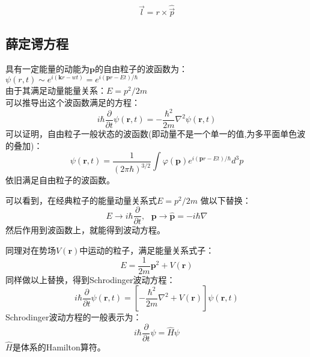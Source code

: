 \begin{equation}
    \vec{{l}}=r \times \hat{\vec{p}}
\end{equation}

\subsection{薛定谔方程}
具有一定能量的动能为$\boldsymbol{p}$的自由粒子的波函数为：  $\psi(r,t)\sim e^{i(\boldsymbol{k}r-wt)}=e^{i(\boldsymbol{p}r-Et)/\hbar}$\\
由于其满足动量能量关系：$E=p^2/2m$\\
可以推导出这个波函数满足的方程：
\begin{equation}
    i\hbar \frac{\partial}{\partial{t}}\psi(\boldsymbol{r},t)=-\frac{\hbar^2}{2m}\nabla^2\psi(\boldsymbol{r},t)
\end{equation}
可以证明，自由粒子一般状态的波函数(即动量不是一个单一的值,为多平面单色波的叠加)：
$$\psi(\boldsymbol{r},t)=\frac{1}{(2\pi\hbar)^{3/2}} \int \varphi(\boldsymbol{p})e^{i(\boldsymbol{p}r-Et)/\hbar} d^3p$$
依旧满足自由粒子的波函数。

可以看到，在经典粒子的能量动量关系式$E=p^2/2m$ 做以下替换：
$$ E\to i\hbar \frac{\partial}{\partial t} , \textbf{  } \boldsymbol{p}\to \boldsymbol{\hat{p}}=-i\hbar\nabla$$
然后作用到波函数上，就能得到波动方程。

同理对在势场$V(\boldsymbol{r})$中运动的粒子，满足能量关系式子：
$$E=\frac{1}{2m}\boldsymbol{p}^2 + V(\boldsymbol{r})$$
同样做以上替换，得到Schrodinger波动方程：
\begin{equation}
    i\hbar \frac{\partial}{\partial{t}}\psi(\boldsymbol{r},t)=\left[-\frac{\hbar^2}{2m}\nabla^2 +V(\boldsymbol{r}) \right]\psi(\boldsymbol{r},t)   
\end{equation}
Schrodinger波动方程的一般表示为：
\begin{equation}
    i \hbar\frac{\partial}{\partial t}\psi =\hat{H}\psi
\end{equation}
$\hat{H}$是体系的Hamilton算符。
